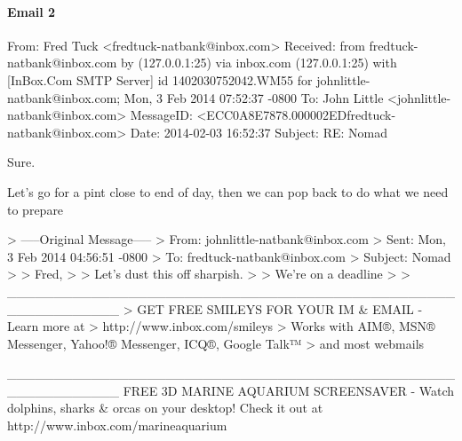 \paragraph{Email 2}
\label{MailNomad2}
\begin{spverbatim}
From: Fred Tuck <fredtuck-natbank@inbox.com>
Received: from fredtuck-natbank@inbox.com by (127.0.0.1:25) via inbox.com
  (127.0.0.1:25) with [InBox.Com SMTP Server] id 1402030752042.WM55 for
  johnlittle-natbank@inbox.com; Mon, 3 Feb 2014 07:52:37 -0800
To: John Little <johnlittle-natbank@inbox.com>
MessageID: <ECC0A8E7878.000002EDfredtuck-natbank@inbox.com>
Date: 2014-02-03 16:52:37
Subject: RE: Nomad

Sure. 

Let's go for a pint close to end of day, then we can pop back to do what we need to prepare

> -----Original Message-----
> From: johnlittle-natbank@inbox.com
> Sent: Mon, 3 Feb 2014 04:56:51 -0800
> To: fredtuck-natbank@inbox.com
> Subject: Nomad
> 
> Fred,
> 
> Let's dust this off sharpish.
> 
> We're on a deadline
> 
> ____________________________________________________________
> GET FREE SMILEYS FOR YOUR IM & EMAIL - Learn more at
> http://www.inbox.com/smileys
> Works with AIM®, MSN® Messenger, Yahoo!® Messenger, ICQ®, Google Talk™
> and most webmails

____________________________________________________________
FREE 3D MARINE AQUARIUM SCREENSAVER - Watch dolphins, sharks & orcas on your desktop!
Check it out at http://www.inbox.com/marineaquarium


\end{spverbatim}

